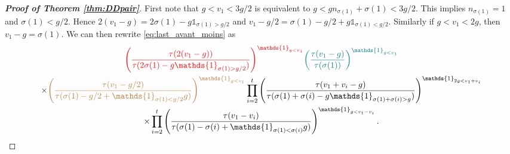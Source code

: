 \documentclass[11pt,letterpaper]{amsart}
\numberwithin{equation}{section}
\numberwithin{df}{section}
\begin{document}
\begin{proof}[\textbf{Proof of Theorem \ref{thm:DDpair}}]
First note that $g<v_1<3g/2$ is equivalent to $g<gn_{\sigma(1)}+\sigma(1)<3g/2$. This implies $n_{\sigma(1)}=1$ and $\sigma(1)<g/2$. Hence $2(v_1-g)=2\sigma(1)-g\mathds{1}_{\sigma(1)>g/2}$ and $v_1-g/2=\sigma(1)-g/2+g\mathds{1}_{\sigma(1)<g/2}$. Similarly if $g<v_1<2g$, then $v_1-g=\sigma(1)$. We can then rewrite \eqref{eq:last_avant_moins} as
\begin{multline}\label{eq:last_moins}
\textcolor{red}{\left(\frac{\tau(2(v_1-g))}{\tau(2\sigma(1)-g\mathds{1}_{\sigma(1)>g/2})}\right)^{\mathds{1}_{g<v_1}}}\textcolor{teal}{\left(\frac{\tau(v_1-g)}{\tau(\sigma(1))}\right)^{\mathds{1}_{g<v_1}}}\\
\times\textcolor{brown}{\left(\frac{\tau(v_1-g/2)}{\tau(\sigma(1)-g/2+\mathds{1}_{\sigma(1)<g/2}g)}\right)^{\mathds{1}_{g<v_1}}}\prod_{i=2}^{t}\left(\frac{\tau(v_1+v_i-g)}{\tau(\sigma(1)+\sigma(i)-g\mathds{1}_{\sigma(1)+\sigma(i)>g})}\right)^{\mathds{1}_{2g<v_1+v_i}}\\\times\prod_{i=2}^{t}\left(\frac{\tau(v_1-v_i)}{\tau(\sigma(1)-\sigma(i)+\mathds{1}_{\sigma(1)<\sigma(i)}g)}\right)^{\mathds{1}_{g<v_1-v_i}}.
\end{multline}



\end{proof}
\end{document}
